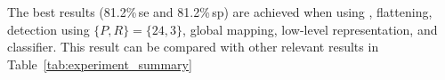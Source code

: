 The best results (81.2\%\,\ac{se} and 81.2\%\,\ac{sp}) are achieved when using \nlm, flattening, \lbptop detection using $\{P,R\}= \{24,3\}$, global mapping, low-level representation, and \rf classifier.
This result can be compared with other relevant results in Table~\ref{tab:experiment_summary}





